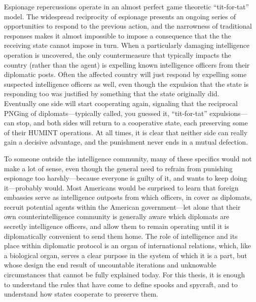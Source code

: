 \documentclass{report}
\begin{document}
Espionage repercussions operate in an almost perfect game theoretic ``tit-for-tat'' model. The widespread reciprocity of espionage presents an ongoing series of opportunities to respond to the previous action, and the narrowness of traditional responses makes it almost impossible to impose a consequence that the the receiving state cannot impose in turn. When a particularly damaging intelligence operation is uncovered, the only countermeasure that typically impacts the country (rather than the agent) is expelling known intelligence officers from their diplomatic posts. Often the affected country will just respond by expelling some suspected intelligence officers as well, even though the expulsion that the state is responding too was justified by something that the state originally did. Eventually one side will start cooperating again, signaling that the reciprocal PNGing of diplomats---typically called, you guessed it, ``tit-for-tat'' expulsions---can stop, and both sides will return to a cooperative state, each preserving some of their HUMINT operations. At all times, it is clear that neither side can really gain a decisive advantage, and the punishment never ends in a mutual defection.

To someone outside the intelligence community, many of these specifics would not make a lot of sense, even though the general need to refrain from punishing espionage too harshly---because everyone is guilty of it, and wants to keep doing it---probably would. Most Americans would be surprised to learn that foreign embassies serve as intelligence outposts from which officers, in cover as diplomats, recruit potential agents within the American government---let alone that their own counterintelligence community is generally aware which diplomats are secretly intelligence officers, and allow them to remain operating until it is diplomatically convenient to send them home. The role of intelligence and its place within diplomatic protocol is an organ of international relations, which, like a biological organ, serves a clear purpose in the system of which it is a part, but whose design the end result of uncountable iterations and unknowable circumstances that cannot be fully explained today. For this thesis, it is enough to understand the rules that have come to define spooks and spycraft, and to understand how states cooperate to preserve them.

\end{document}
